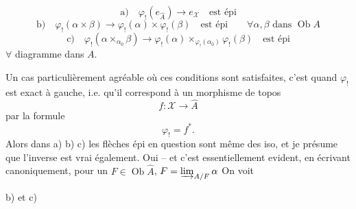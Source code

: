 
\[
\text{a)}\quad \varphi_!(e_{\widehat A})\longrightarrow e_{\mathcal X}\quad\text{est épi}
\]
\[
\text{b)}\quad \varphi_!(\alpha\times\beta)\longrightarrow
\varphi_!(\alpha)\times\varphi_!(\beta)\quad\text{est épi}
\qquad \forall\alpha,\beta\text{ dans }\operatorname{Ob}A
\]
\[
\text{c)}\quad \varphi_!(\alpha\times_{\alpha_0}\beta)\longrightarrow
\varphi_!(\alpha)\times_{\varphi_!(\alpha_0)}\varphi_!(\beta)\quad\text{est épi}
\]
$\forall$ diagramme
dans $A$.

Un cas particulièrement agréable où ces conditions sont satisfaites, c'est quand $\varphi_!$ est exact à gauche, i.e. qu'il correspond  à un morphisme de topos
\[
f:\mathcal X\longrightarrow\widehat A
\]
par la formule
\[
\varphi_!=f^*.
\]
Alors dans a) b) c) les flèches épi en question sont même des iso, et je présume que l'inverse est vrai également. Oui -- et c'est essentiellement evident, en écrivant canoniquement, pour un $F\in\operatorname{Ob}\widehat A$, $F=\varinjlim_{A/F}\alpha$ \unsure{$\ldots$} On voit

 b) et c)

